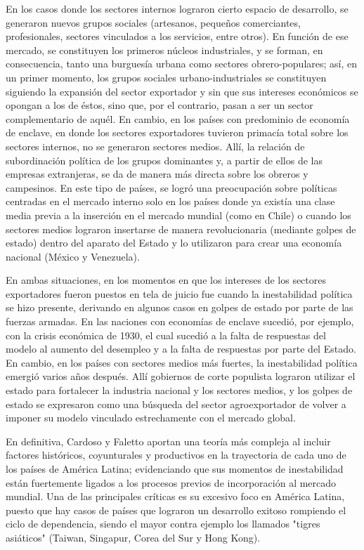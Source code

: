 \documentclass{article}
\begin{document}
En los casos donde los sectores internos lograron cierto espacio de desarrollo, se generaron
nuevos grupos sociales (artesanos, pequeños comerciantes, profesionales, sectores vinculados
a los servicios, entre otros). En función de ese mercado, se constituyen los primeros 
núcleos industriales, y se forman, en consecuencia, tanto una burguesía urbana como sectores 
obrero-populares; así, en un primer momento, los grupos sociales urbano-industriales se 
constituyen siguiendo la expansión del sector exportador y sin que sus intereses económicos 
se opongan a los de éstos, sino que, por el contrario, pasan a ser un sector complementario 
de aquél. En cambio, en los países con predominio de economía de enclave, en donde los 
sectores exportadores tuvieron primacía total sobre los sectores internos, no se generaron 
sectores medios. Allí, la relación de subordinación política de los grupos dominantes y, a 
partir de ellos de las empresas extranjeras, se da de manera más directa sobre los obreros y 
campesinos. En este tipo de países, se logró una preocupación sobre políticas centradas en 
el mercado interno solo en los países donde ya existía una clase media previa a la inserción 
en el mercado mundial (como en Chile) o cuando los sectores medios lograron insertarse de manera 
revolucionaria (mediante golpes de estado) dentro del aparato del Estado y lo utilizaron 
para crear una economía nacional (México y Venezuela).

En ambas situaciones, en los momentos en que los intereses de los sectores exportadores
fueron puestos en tela de juicio fue cuando la inestabilidad política se hizo presente, 
derivando en algunos casos en golpes de estado por parte de las fuerzas armadas. En las
naciones con economías de enclave sucedió, por ejemplo, con la crisis económica de 1930,
el cual sucedió a la falta de respuestas del modelo al aumento del desempleo y a la 
falta de respuestas por parte del Estado. En cambio,
en los países con sectores medios más fuertes, la inestabilidad política emergió varios
años después. Allí gobiernos de corte populista lograron utilizar el estado para fortalecer
la industria nacional y los sectores medios, y los golpes de estado se expresaron como
una búsqueda del sector agroexportador de volver a imponer su modelo vinculado estrechamente
con el mercado global.

En definitiva, Cardoso y Faletto aportan una teoría más compleja al incluir factores
históricos, coyunturales y productivos en la trayectoria de cada uno de los países de 
América Latina; evidenciando que sus momentos de inestabilidad están fuertemente ligados
a los procesos previos de incorporación al mercado mundial. Una de las principales críticas
es su excesivo foco en América Latina, puesto que hay casos de países que lograron un 
desarrollo exitoso rompiendo el ciclo de dependencia, siendo el mayor contra ejemplo los
llamados "tigres asiáticos" (Taiwan, Singapur, Corea del Sur y Hong Kong).
\end{document}
